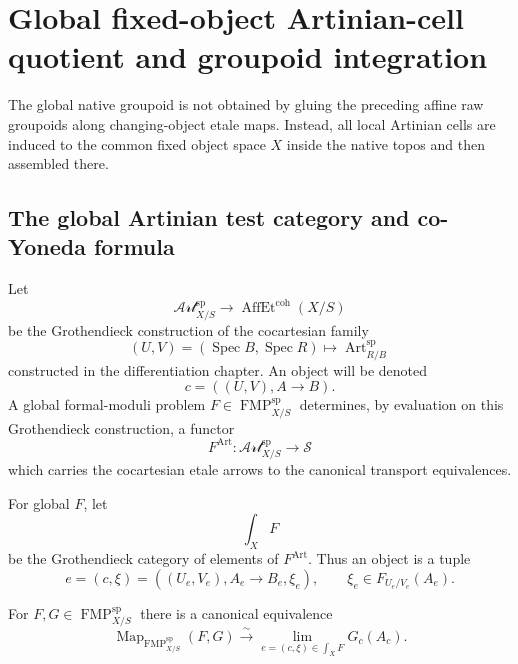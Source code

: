 \section{Global fixed-object Artinian-cell quotient and groupoid integration}
\label{sec:bnli-global-integration}

The global native groupoid is not obtained by gluing the preceding affine raw
groupoids along changing-object etale maps.  Instead, all local Artinian cells
are induced to the common fixed object space $X$ inside the native topos and
then assembled there.

\subsection{The global Artinian test category and co-Yoneda formula}

\begin{definition}
\label{def:bnli-global-artinian-category}
Let
\[
    \mathscr{Art}^{\mathrm{sp}}_{X/S}
    \longrightarrow
    \operatorname{AffEt}^{\mathrm{coh}}(X/S)
\]
be the Grothendieck construction of the cocartesian family
\[
    (U,V)=(\operatorname{Spec}B,\operatorname{Spec}R)
    \longmapsto
    \operatorname{Art}^{\mathrm{sp}}_{R/B}
\]
constructed in the differentiation chapter.  An object will be denoted
\[
    c=((U,V),A\to B).
\]
A global formal-moduli problem
$F\in\operatorname{FMP}^{\mathrm{sp}}_{X/S}$ determines, by evaluation on this
Grothendieck construction, a functor
\[
    F^{\mathrm{Art}}:
    \mathscr{Art}^{\mathrm{sp}}_{X/S}
    \longrightarrow\mathcal S
\]
which carries the cocartesian etale arrows to the canonical transport
equivalences.
\end{definition}

\begin{definition}
\label{def:bnli-global-category-elements}
For global $F$, let
\[
    \int_XF
\]
be the Grothendieck category of elements of $F^{\mathrm{Art}}$.  Thus an object
is a tuple
\[
    e=(c,\xi)
    =((U_e,V_e),A_e\to B_e,\xi_e),
    \qquad
    \xi_e\in F_{U_e/V_e}(A_e).
\]
\end{definition}

\begin{lemma}
\label{lem:bnli-global-artinian-coyoneda}
For $F,G\in\operatorname{FMP}^{\mathrm{sp}}_{X/S}$ there is a canonical
equivalence
\[
\boxed{
    \operatorname{Map}_{\operatorname{FMP}^{\mathrm{sp}}_{X/S}}(F,G)
    \xrightarrow{\sim}
    \operatorname*{lim}_{e=(c,\xi)\in\int_XF}
    G_c(A_c).}
\]
\end{lemma}

